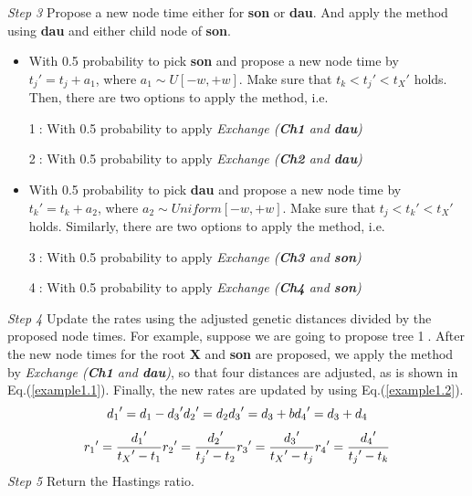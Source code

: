 \documentclass{bmcart}
\begin{document}
\emph{Step 3} Propose a new node time either for \textbf{son} or \textbf{dau}. And apply the method using \textbf{dau} and either child node of \textbf{son}.
\begin{itemize}
\item With 0.5 probability to pick \textbf{son} and propose a new node time by ${t_j}' = {t_j} + {a_1}$, where ${a_1} \sim U[ - w, + w]$. Make sure that ${t_k} < {t_j}' < {t_X}'$ holds. Then, there are two options to apply the method, i.e.

\textcircled1: With 0.5 probability to apply \textit{Exchange (\textbf{Ch1} and \textbf{dau})}

\textcircled2: With 0.5 probability to apply \textit{Exchange (\textbf{Ch2} and \textbf{dau})}

\item With 0.5 probability to pick \textbf{dau} and propose a new node time by ${t_k}' = {t_k} + {a_2}$, where ${a_2} \sim Uniform[ - w, + w]$. Make sure that ${t_j} < {t_k}' < {t_X}'$ holds. Similarly, there are two options to apply the method, i.e.

\textcircled3: With 0.5 probability to apply \textit{Exchange (\textbf{Ch3} and \textbf{son})}

\textcircled4: With 0.5 probability to apply \textit{Exchange (\textbf{Ch4} and \textbf{son})}
\end{itemize}

\emph{Step 4}  Update the rates using the adjusted genetic distances divided by the proposed node times. For example, suppose we are going to propose tree \textcircled1. After the new node times for the root \textbf{X} and \textbf{son} are proposed, we apply the method by \textit{Exchange (\textbf{Ch1} and \textbf{dau})}, so that four distances are adjusted, as is shown in Eq.(\ref{example1.1}). Finally, the new rates are updated by using Eq.(\ref{example1.2}).
\begin{equation}\label{example1.1}
{d_1}' = {d_1} - {d_3}'  \\
{d_2}' = {d_2} \\
{d_3}' = {d_3} + b \\
{d_4}' = {d_3} + {d_4}
\end{equation}
\begin{equation}\label{example1.2}
{r_1}' = \frac{{{d_1}'}}{{{t_X}' - {t_1}}} \\
{r_2}' = \frac{{{d_2}'}}{{{t_j}' - {t_2}}} \\
{r_3}' = \frac{{{d_3}'}}{{{t_X}' - {t_j}}} \\
{r_4}' = \frac{{{d_4}'}}{{{t_j}' - {t_k}}} 
\end{equation}
\emph{Step 5} Return the Hastings ratio.
\end{document}
